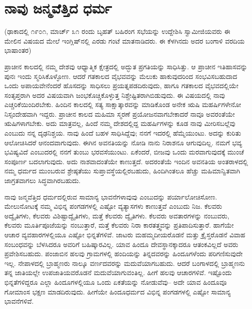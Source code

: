 
\chapter{ನಾವು ಜನ್ಮವೆತ್ತಿದ ಧರ್ಮ}

(ಢಾಕಾದಲ್ಲಿ ೧೯೦೧, ಮಾರ್ಚ್ ೩೧ ರಂದು ಬೃಹತ್​ ಬಹಿರಂಗ ಸಭೆಯನ್ನು ಉದ್ದೇಶಿಸಿ ಸ್ವಾಮೀಜಿಯವರು ಈ ಮೇಲಿನ ವಿಷಯದ ಮೇಲೆ ಇಂಗ್ಲಿಷ್​ನಲ್ಲಿ ಎರಡು ಗಂಟೆ ಮಾತನಾಡಿದರು. ಈ ಕೆಳಗಿನದು ಅದರ ಬಂಗಾಳಿ ವರದಿಯ ಭಾಷಾಂತರ)

ಪ್ರಾಚೀನ ಕಾಲದಲ್ಲಿ ನಮ್ಮ ದೇಶವು ಆಧ್ಯಾತ್ಮಿಕ ಕ್ಷೇತ್ರದಲ್ಲಿ ಅದ್ಭುತ ಪ್ರಗತಿಯನ್ನು ಸಾಧಿಸಿತ್ತು. ಆ ಪ್ರಾಚೀನ ಇತಿಹಾಸವನ್ನು ಪುನಃ ಇಂದು ಸ್ಮರಿಸಿಕೊಳ್ಳೋಣ. ಆದರೆ ಗತಕಾಲದ ವೈಭವವನ್ನು ಮೆಲುಕು ಹಾಕುವುದರಿಂದ ಸಂಭವಿಸಬಹುದಾದ ಒಂದು ಅಪಾಯವೇನೆಂದರೆ ಹೊಸದನ್ನು ಸಾಧಿಸಲು ಪ್ರಯತ್ನಪಡದಿರುವುದು, ಹಾಗೂ ಗತಕಾಲದ ವೈಭವದಲ್ಲಿಯೇ ಸಂತೃಪ್ತರಾಗಿ ಅದರ ವಿಷಯವಾಗಿ ಜಂಭಕೊಚ್ಚಿಕೊಳ್ಳುತ್ತ ನಿಶ್ಚೇಷ್ಟಿತರಾಗಿಬಿಡುವುದು. ಈ ವಿಷಯದಲ್ಲಿ ನಾವು ಎಚ್ಚರಿಕೆಯಿಂದಿರಬೇಕು. ಹಿಂದಿನ ಕಾಲದಲ್ಲಿ ಸತ್ಯ ಸಾಕ್ಷಾತ್ಕಾರವನ್ನು ಮಾಡಿಕೊಂಡ ಅನೇಕ ಋಷಿ ಮಹರ್ಷಿಗಳೇನೋ ನಿಸ್ಸಂದೇಹವಾಗಿ ಇದ್ದರು. ಪ್ರಾಚೀನ ಕಾಲದ ಮಹಿಮಾ ಸ್ಮರಣೆ ಪ್ರಯೋಜನವಾಗಬೇಕಾದರೆ ನಾವೂ ಅವರಂತೆಯೇ ಋಷಿಗಳಾಗಬೇಕು. ಅದು ಮಾತ್ರವಲ್ಲ, ಹಿಂದೆ ನಮ್ಮ ದೇಶದಲ್ಲಿದ್ದ ಮಹರ್ಷಿಗಳನ್ನು ಕೂಡ ನಾವು ಮೀರಿಸಬಲ್ಲೆವು ಎಂಬುದು ನನ್ನ ದೃಢನಿಶ್ಚಯ. ನಾವು ಹಿಂದೆ ಬಹಳ ಸಾಧಿಸಿದ್ದೆವು; ನನಗೆ ಇದರಲ್ಲಿ ಹೆಮ್ಮೆಯುಂಟು. ಅದನ್ನು ಕುರಿತು ಆಲೋಚಿಸಿದರೆ ಆನಂದವಾಗುವುದು. ಈಗಿನ ಅವನತಿಯನ್ನು ನೋಡಿ ನಾನು ನಿರಾಶನೂ ಆಗುವುದಿಲ್ಲ. ನಮಗೆ ಭವ್ಯ ಭವಿಷ್ಯವಿದೆ ಎಂಬುದರಲ್ಲಿ ನನಗೆ ತುಂಬು ಭರವಸೆಯುಂಟು. ಏಕೆಂದರೆ, ಬೀಜವು ಒಂದು ಮರವಾಗುವುದಕ್ಕೆ ಮುಂಚೆ ಸಂಪೂರ್ಣ ಬದಲಾಗುವುದು. ಅದು ನಾಶವಾದಂತೆಯೇ ಕಾಣುತ್ತದೆ. ಅದರಂತೆಯೆ ಇಂದಿನ ಅವನತಿಯ ಅಂತರಾಳದಲ್ಲಿ ನಮ್ಮ ಧರ್ಮದ ಮುಂಬರುವ ಶ್ರೇಷ್ಠತೆಯು ಸುಪ್ತಾವಸ್ಥೆಯಲ್ಲಿರಬಹುದು, ಹಿಂದಿಗಿಂತಲೂ ಹೆಚ್ಚು ಮಹಿಮಾನ್ವಿತವಾಗಿ ಜಾಗ್ರತವಾಗಲು ಸಿದ್ಧವಾಗಿರಬಹುದು. 

ನಾವು ಜನ್ಮವೆತ್ತಿದ ಧರ್ಮದಲ್ಲಿರುವ ಸಾಮಾನ್ಯ ಭಾವನೆಗಳಾವುವು ಎಂಬುದನ್ನು ಪರ್ಯಾಲೋಚಿಸೋಣ. ಮೇಲುನೋಟಕ್ಕೆ ನಮ್ಮ ವಿಭಿನ್ನ ಪಂಗಡಗಳಲ್ಲಿ ಎಷ್ಟೋ ವ್ಯತ್ಯಾಸಗಳು ಕಾಣುತ್ತವೆ ಎಂಬುದು ನಿಜ. ಕೆಲವರು ಅದ್ವೈತಿಗಳು, ಕೆಲವರು ವಿಶಿಷ್ಟಾದ್ವೈತಿಗಳು, ಮತ್ತೆ ಕೆಲವರು ದ್ವೈತಿಗಳು. ಕೆಲವರು ಅವತಾರಗಳನ್ನು ನಂಬುವರು, ಕೆಲವರು ಮೂರ್ತಿಪೂಜೆಯನ್ನು ನಂಬುತ್ತಾರೆ, ಮತ್ತೆ ಕೆಲವರು ನಿರಾ ಕಾರತತ್ತ್ವವನ್ನು ಪ್ರತಿಪಾದಿಸುತ್ತಾರೆ. ಹಾಗೆಯೇ ಆಚಾರ ವ್ಯವಹಾರಗಳಲ್ಲಿಯೂ ಎಷ್ಟೋ ಭಿನ್ನತೆಗಳಿವೆ. ಜಾಟರು ಮಹಮ್ಮದೀಯರೊಡನೆ ಮತ್ತು ಕ್ರೈಸ್ತರೊಡನೆ ವಿವಾಹ ಸಂಬಂಧವನ್ನು ಬೆಳಸಿದರೂ ಅವರಿಗೆ ಬಹಿಷ್ಕಾರವಿಲ್ಲ. ಯಾವ ಹಿಂದೂ ದೇವಸ್ಥಾನಕ್ಕಾದರೂ ಆತಂಕವಿಲ್ಲದೆ ಅವರು ಪ್ರವೇಶಿಸಬಹುದು. ಪಂಜಾಬಿನ ಹಲವು ಗ್ರಾಮಗಳಲ್ಲಿ ಹಂದಿಯನ್ನು ತಿನ್ನದವರನ್ನು ಹಿಂದೂಗಳೆಂದು ಪರಿಗಣಿಸುವುದೇ ಇಲ್ಲ. ನೇಪಾಳದಲ್ಲಿ ಬ್ರಾಹ್ಮಣರು ನಾಲ್ಕೂ ವರ್ಣದವರನ್ನು ಮದುವೆಯಾಗಬಹುದು. ಆದರೆ ಬಂಗಾಳದಲ್ಲಿ ಬ್ರಾಹ್ಮಣನು ತನ್ನ ಜಾತಿಯಲ್ಲೇ ಉಪಜಾತಿಯವರೊಡನೆ ಮದುವೆಯಾಗುವಂತಿಲ್ಲ. ಹೀಗೆ ಹಲವು ಆಚಾರಗಳಿವೆ. ಇಷ್ಟೊಂದು ಭಿನ್ನತೆಗಳಿದ್ದರೂ ಎಲ್ಲಾ ಹಿಂದೂಗಳಲ್ಲಿಯೂ ಒಂದು ಏಕತೆಯನ್ನು ನೋಡುವೆವು– ಅದೇ ಯಾವ ಹಿಂದೂವೂ ಗೋಮಾಂಸ ಭಕ್ಷಣ ಮಾಡದಿರುವುದು. ಹೀಗೆಯೇ ಹಿಂದೂಧರ್ಮದ ವಿಭಿನ್ನ ಪಂಗಡಗಳಲ್ಲಿ ಎಷ್ಟೋ ಸಾಮಾನ್ಯ ಭಾವನೆಗಳಿವೆ. 


